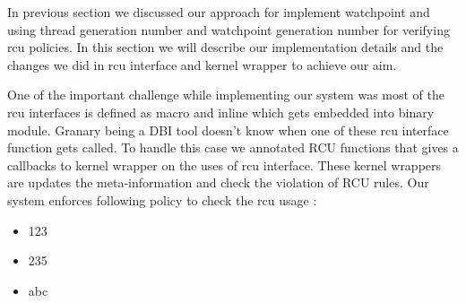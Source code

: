 In previous section we discussed our approach for implement watchpoint and using thread generation number and watchpoint generation number for verifying rcu policies. In this section we will describe our implementation details and the changes we did in rcu interface and kernel wrapper to achieve our aim. 

One of the important challenge while implementing our system was most of the rcu interfaces is defined as macro and inline which gets embedded into binary module. Granary being a DBI tool doesn’t know when one of these rcu interface function gets called. To handle this case we annotated RCU functions that gives a callbacks to kernel wrapper on the uses of rcu interface. These kernel wrappers are updates the meta-information and check the violation of RCU rules. Our system enforces following policy to check the rcu usage : 

\begin {itemize}
	\item 123	
	\item 235
	\item abc
\end{itemize}

